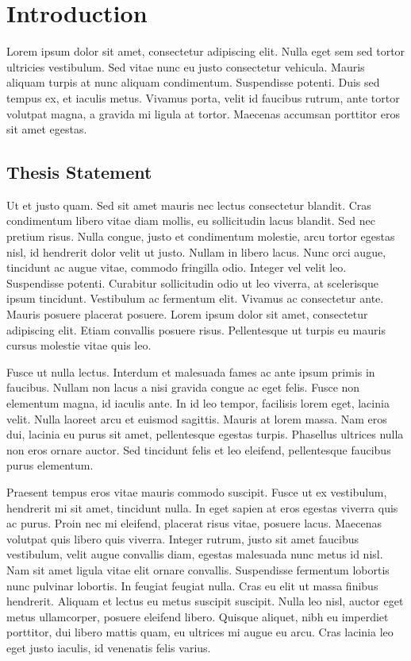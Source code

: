 
\chapter{Introduction}

Lorem ipsum dolor sit amet, consectetur adipiscing elit. Nulla eget sem sed tortor ultricies vestibulum. Sed vitae nunc eu justo consectetur vehicula. Mauris aliquam turpis at nunc aliquam condimentum. Suspendisse potenti. Duis sed tempus ex, et iaculis metus. Vivamus porta, velit id faucibus rutrum, ante tortor volutpat magna, a gravida mi ligula at tortor. Maecenas accumsan porttitor eros sit amet egestas.

\section{Thesis Statement}

Ut et justo quam. Sed sit amet mauris nec lectus consectetur blandit. Cras condimentum libero vitae diam mollis, eu sollicitudin lacus blandit. Sed nec pretium risus. Nulla congue, justo et condimentum molestie, arcu tortor egestas nisl, id hendrerit dolor velit ut justo. Nullam in libero lacus. Nunc orci augue, tincidunt ac augue vitae, commodo fringilla odio. Integer vel velit leo. Suspendisse potenti. Curabitur sollicitudin odio ut leo viverra, at scelerisque ipsum tincidunt. Vestibulum ac fermentum elit. Vivamus ac consectetur ante. Mauris posuere placerat posuere. Lorem ipsum dolor sit amet, consectetur adipiscing elit. Etiam convallis posuere risus. Pellentesque ut turpis eu mauris cursus molestie vitae quis leo.

Fusce ut nulla lectus. Interdum et malesuada fames ac ante ipsum primis in faucibus. Nullam non lacus a nisi gravida congue ac eget felis. Fusce non elementum magna, id iaculis ante. In id leo tempor, facilisis lorem eget, lacinia velit. Nulla laoreet arcu et euismod sagittis. Mauris at lorem massa. Nam eros dui, lacinia eu purus sit amet, pellentesque egestas turpis. Phasellus ultrices nulla non eros ornare auctor. Sed tincidunt felis et leo eleifend, pellentesque faucibus purus elementum.

Praesent tempus eros vitae mauris commodo suscipit. Fusce ut ex vestibulum, hendrerit mi sit amet, tincidunt nulla. In eget sapien at eros egestas viverra quis ac purus. Proin nec mi eleifend, placerat risus vitae, posuere lacus. Maecenas volutpat quis libero quis viverra. Integer rutrum, justo sit amet faucibus vestibulum, velit augue convallis diam, egestas malesuada nunc metus id nisl. Nam sit amet ligula vitae elit ornare convallis. Suspendisse fermentum lobortis nunc pulvinar lobortis. In feugiat feugiat nulla. Cras eu elit ut massa finibus hendrerit. Aliquam et lectus eu metus suscipit suscipit. Nulla leo nisl, auctor eget metus ullamcorper, posuere eleifend libero. Quisque aliquet, nibh eu imperdiet porttitor, dui libero mattis quam, eu ultrices mi augue eu arcu. Cras lacinia leo eget justo iaculis, id venenatis felis varius.


